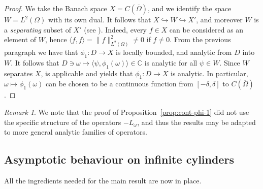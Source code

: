 \documentclass[a4paper, reqno]{amsart}
\numberwithin{equation}{section}
\theoremstyle{plain}
\theoremstyle{definition}
\theoremstyle{remark}
\newtheorem{remark}[theorem]{Remark}
\newcommand{\CC}{\mathbb{C}}
\begin{document}
\begin{proof}
  We take the Banach space $X = C(\overline\Omega)$, and we identify the space $W = L^2(\Omega)$ with its own dual. It follows that $X \hookrightarrow W \hookrightarrow X'$, and moreover $W$ is a \emph{separating} subset of $X'$ (see \cite[p.\ 787]{AN00}). Indeed, every $f \in X$ can be considered as an element of $W$, hence $\langle f,f\rangle = \|f\|^2_{L^2(\Omega)} \ne 0$ if $f \ne 0$. From the previous paragraph we have that $\phi_1\colon D \to X$ is locally bounded, and analytic from $D$ into $W$. It follows that $D \ni \omega \mapsto \langle \psi, \phi_1(\omega)\rangle \in \CC$ is analytic for all $\psi \in W$. Since $W$ separates $X$, \cite[Theorem 3.1]{AN00} is applicable and yields that $\phi_1\colon D \to X$ is analytic. In particular, $\omega\mapsto\phi_1(\omega)$ can be chosen to be a continuous function from $[-\delta,\delta]$ to $C(\overline\Omega)$.
\end{proof}

\begin{remark}
  We note that the proof of Proposition~\ref{prop:cont-phi-1} did not use the specific structure of the operators $-L_\omega$, and thus the results may be adapted to more general analytic families of operators.
\end{remark}

\subsection{Asymptotic behaviour on infinite cylinders}
All the ingredients needed for the main result are now in place.
\end{document}
